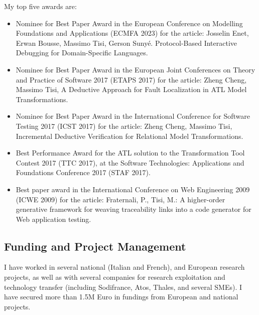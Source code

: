 \medskip
My top five awards are: 
\begin{itemize}
\item Nominee for Best Paper Award in the European Conference on Modelling Foundations and Applications (ECMFA 2023) for the article: Josselin Enet, Erwan Bousse, Massimo Tisi, Gerson Sunyé. Protocol-Based Interactive Debugging for Domain-Specific Languages.
\item Nominee for Best Paper Award in the European Joint Conferences on Theory and Practice of Software 2017 (ETAPS 2017) for the article: Zheng Cheng, Massimo Tisi, A Deductive Approach for Fault Localization in ATL Model Transformations.
\item Nominee for Best Paper Award in the International Conference for Software Testing 2017 (ICST 2017) for the article: Zheng Cheng, Massimo Tisi, Incremental Deductive Verification for Relational Model Transformations.
\item Best Performance Award for the ATL solution to the Transformation Tool Contest 2017 (TTC 2017), at the Software Technologies: Applications and Foundations Conference 2017 (STAF 2017).
\item Best paper award in the International Conference on Web Engineering 2009 (ICWE 2009) for the article: Fraternali, P., Tisi, M.: A higher-order generative framework for weaving traceability links into a code generator for Web application testing.
\end{itemize}

\subsection*{Funding and Project Management}
I have worked in several national (Italian and French), and European research projects, as well as with several companies for research exploitation and technology transfer (including Sodifrance, Atos, Thales, and several SMEs). I have secured more than 1.5M Euro in fundings from European and national projects.

